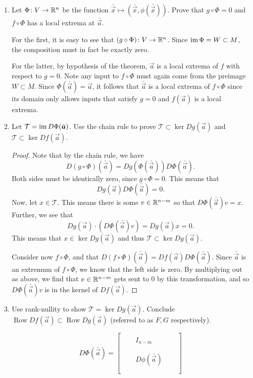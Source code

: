 \documentclass{article}
\newcommand{\bv}[1]{\bar{\vec{#1}}}
\newcommand{\T}{\mathcal{T}}
\begin{document}
\begin{enumerate}[start=1,label={(\alph*)}]
  \item Let $\Phi\from V \to \RR[n]$ be the function $\bv{x} \mapsto (\bv{x}, \phi(\bv{x}))$. Prove that $g \circ \Phi = 0$ and $f \circ \Phi$ has a local extrema at $\bv{a}$.

        For the first, it is easy to see that $(g \circ \Phi) \from V \to \RR[n]$. Since $\im \Phi = W \subset M$, the composition must in fact be exactly zero.

        For the latter, by hypothesis of the theorem, $\vec{a}$ is a local extrema of $f$ with respect to $g = 0$.
        Note any input to $f \circ \Phi$ must again come from the preimage $W \subset M$.
        Since $\Phi(\bv{a}) = \vec{a}$, it follows that $\bv{a}$ is a local extrema of $f \circ \Phi$ since its domain only allows inputs that satisfy $g = 0$
        and $f(\vec{a})$ is a local extrema.

  \item Let $\T = \im D \Phi(\bv{a})$. Use the chain rule to prove $\T \subset \ker D g(\vec{a})$ and $\T \subset \ker D f(\vec{a})$.

        \begin{proof}
          Note that by the chain rule, we have
          \[ D (g \circ \Phi)(\bv{a}) = D g(\Phi(\bv{a})) D \Phi(\bv{a}). \]
          Both sides must be identically zero, since $g \circ \Phi = 0$.
          This means that
          \[ D g(\vec{a}) D\Phi(\bv{a}) = 0. \]
          Now, let $x \in \T$. This means there is some $v \in \RR[n-m]$ so that $D\Phi(\bv{a})v = x$.
          Further, we see that
          \[ D g(\vec{a}) \cdot (D \Phi(\bv{a}) v) = D g(\vec{a}) x = 0. \]
          This means that $x \in \ker D g(\vec{a})$ and thus $\T \subset \ker D g(\vec{a})$.

          Consider now $f \circ \Phi$, and that $D(f \circ \Phi)(\bv{a}) = Df(\vec{a})D\Phi(\bv{a})$.
          Since $\bv{a}$ is an extremum of $f \circ \Phi$, we know that the left side is zero.
          By multiplying out as above, we find that $v \in \RR[n-m]$ gets sent to 0 by this transformation,
          and so $D\Phi(\bv{a})v$ is in the kernel of $Df(\vec{a})$.
        \end{proof}

  \item Use rank-nullity to show $\T = \ker D g(\vec{a})$. Conclude $\operatorname{Row} Df(\vec{a}) \subset \operatorname{Row} Dg(\vec{a})$ (referred to as $F, G$ respectively).

        \[ D\Phi(\bv{a}) = \begin{bmatrix}
          \\ \quad & I_{n - m} & \quad \\ \\
          \\ \quad & D\phi(\bv{a}) & \quad \\ \\
        \end{bmatrix} \]


\end{enumerate}
\end{document}

